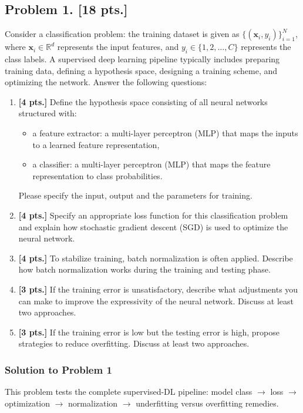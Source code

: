 \documentclass[11pt,a4paper]{article}
\theoremstyle{definition}
\begin{document}
\subsection{Problem 1. [18 pts.]}
Consider a classification problem: the training dataset is given as $\{(\mathbf{x}_i, y_i)\}_{i=1}^N$, where $\mathbf{x}_i \in \mathbb{R}^d$ represents the input features, and $y_i \in \{1, 2, \dots, C\}$ represents the class labels. A supervised deep learning pipeline typically includes preparing training data, defining a hypothesis space, designing a training scheme, and optimizing the network. Answer the following questions:
\begin{enumerate}[label=(\alph*)]
    \item \textbf{[4 pts.]} Define the hypothesis space consisting of all neural networks structured with:
    \begin{itemize}
        \item a feature extractor: a multi-layer perceptron (MLP) that maps the inputs to a learned feature representation,
        \item a classifier: a multi-layer perceptron (MLP) that maps the feature representation to class probabilities.
    \end{itemize}
    Please specify the input, output and the parameters for training.
    \item \textbf{[4 pts.]} Specify an appropriate loss function for this classification problem and explain how stochastic gradient descent (SGD) is used to optimize the neural network.
    \item \textbf{[4 pts.]} To stabilize training, batch normalization is often applied. Describe how batch normalization works during the training and testing phase.
    \item \textbf{[3 pts.]} If the training error is unsatisfactory, describe what adjustments you can make to improve the expressivity of the neural network. Discuss at least two approaches.
    \item \textbf{[3 pts.]} If the training error is low but the testing error is high, propose strategies to reduce overfitting. Discuss at least two approaches.
\end{enumerate}

\subsubsection{Solution to Problem 1}

This problem tests the complete supervised-DL pipeline: model class $\to$ loss $\to$ optimization $\to$ normalization $\to$ underfitting versus overfitting remedies.
\end{document}
